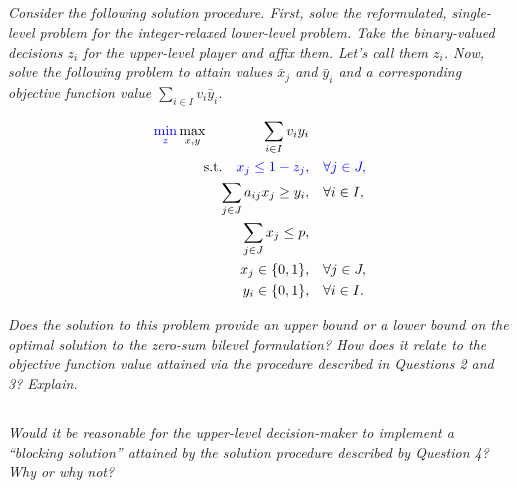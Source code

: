 \documentclass[12pt]{amsart}
\begin{document}
\subsection{}
\textit{Consider the following solution procedure. First, solve the reformulated, single-level
	problem for the integer-relaxed lower-level problem. Take the binary-valued decisions $z_i$
	for the upper-level player and affix them. Let’s call them $z_i$. Now, solve the following
	problem to attain values $\bar x_j$ and $\bar y_i$ and a corresponding objective function 
	value $\sum_{i\in I}v_i\bar y_i$.}

	\begin{align*}
		{\color{blue}\min_z}\max_{x,y} \qquad\qquad \sum_{i\in I} v_iy_i& \\
		\text{s.t.}\quad
		{\color{blue} x_j \leq 1-z_j,}& \quad {\color{blue}\forall j\in J,}\\
		\sum_{j\in J} a_{ij}x_j \geq y_i,& \quad \forall i\in I, \\
		\sum_{j\in J} x_j \leq p,& \\
		x_j \in \{0,1\},& \quad \forall j\in J, \\
		y_i \in \{0,1\},& \quad \forall i\in I.
	\end{align*}

\textit{Does the solution to this problem provide an upper bound or a lower bound on the optimal
	solution to the zero-sum bilevel formulation? How does it relate to the objective function
	value attained via the procedure described in Questions 2 and 3? Explain.}
	

\subsection{}
\textit{Would it be reasonable for the upper-level decision-maker to implement a “blocking
	solution” attained by the solution procedure described by Question 4? Why or why not?}
\end{document}
